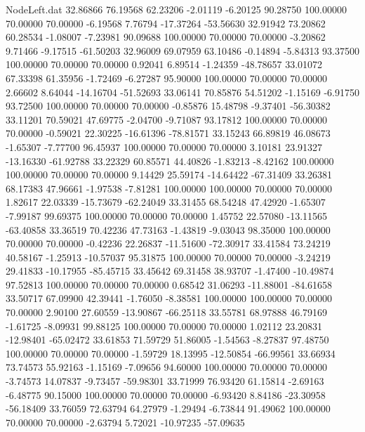 \begin{filecontents}{NodeLeft.dat}
  32.86866   76.19568   62.23206    -2.01119   -6.20125   90.28750  100.00000   70.00000   70.00000   -6.19568    7.76794  -17.37264  -53.56630
  32.91942   73.20862   60.28534    -1.08007   -7.23981   90.09688  100.00000   70.00000   70.00000   -3.20862    9.71466   -9.17515  -61.50203
  32.96009   69.07959   63.10486    -0.14894   -5.84313   93.37500  100.00000   70.00000   70.00000    0.92041    6.89514   -1.24359  -48.78657
  33.01072   67.33398   61.35956    -1.72469   -6.27287   95.90000  100.00000   70.00000   70.00000    2.66602    8.64044  -14.16704  -51.52693
  33.06141   70.85876   54.51202    -1.15169   -6.91750   93.72500  100.00000   70.00000   70.00000   -0.85876   15.48798   -9.37401  -56.30382
  33.11201   70.59021   47.69775    -2.04700   -9.71087   93.17812  100.00000   70.00000   70.00000   -0.59021   22.30225  -16.61396  -78.81571
  33.15243   66.89819   46.08673    -1.65307   -7.77700   96.45937  100.00000   70.00000   70.00000    3.10181   23.91327  -13.16330  -61.92788
  33.22329   60.85571   44.40826    -1.83213   -8.42162  100.00000  100.00000   70.00000   70.00000    9.14429   25.59174  -14.64422  -67.31409
  33.26381   68.17383   47.96661    -1.97538   -7.81281  100.00000  100.00000   70.00000   70.00000    1.82617   22.03339  -15.73679  -62.24049
  33.31455   68.54248   47.42920    -1.65307   -7.99187   99.69375  100.00000   70.00000   70.00000    1.45752   22.57080  -13.11565  -63.40858
  33.36519   70.42236   47.73163    -1.43819   -9.03043   98.35000  100.00000   70.00000   70.00000   -0.42236   22.26837  -11.51600  -72.30917
  33.41584   73.24219   40.58167    -1.25913  -10.57037   95.31875  100.00000   70.00000   70.00000   -3.24219   29.41833  -10.17955  -85.45715
  33.45642   69.31458   38.93707    -1.47400  -10.49874   97.52813  100.00000   70.00000   70.00000    0.68542   31.06293  -11.88001  -84.61658
  33.50717   67.09900   42.39441    -1.76050   -8.38581  100.00000  100.00000   70.00000   70.00000    2.90100   27.60559  -13.90867  -66.25118
  33.55781   68.97888   46.79169    -1.61725   -8.09931   99.88125  100.00000   70.00000   70.00000    1.02112   23.20831  -12.98401  -65.02472
  33.61853   71.59729   51.86005    -1.54563   -8.27837   97.48750  100.00000   70.00000   70.00000   -1.59729   18.13995  -12.50854  -66.99561
  33.66934   73.74573   55.92163    -1.15169   -7.09656   94.60000  100.00000   70.00000   70.00000   -3.74573   14.07837   -9.73457  -59.98301
  33.71999   76.93420   61.15814    -2.69163   -6.48775   90.15000  100.00000   70.00000   70.00000   -6.93420    8.84186  -23.30958  -56.18409
  33.76059   72.63794   64.27979    -1.29494   -6.73844   91.49062  100.00000   70.00000   70.00000   -2.63794    5.72021  -10.97235  -57.09635

\end{filecontents}
